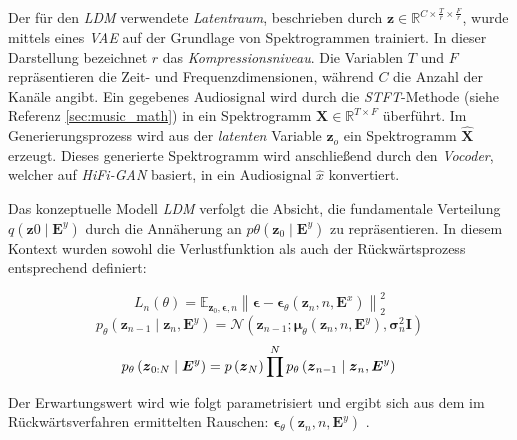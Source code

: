 \documentclass[
  a4paper,  %
  twoside,  %
  bibliography=totoc,
  headsepline,
  cleardoublepage=empty,
  parskip=half,
  draft=false
]{scrbook}
\begin{document}
Der für den \emph{LDM} verwendete \emph{Latentraum}, beschrieben durch $\boldsymbol{z} \in \mathbb{R}^{C \times \frac{T}{r} \times \frac{F}{r}}$, wurde mittels eines \emph{VAE} auf der Grundlage von Spektrogrammen trainiert. In dieser Darstellung bezeichnet $r$ das \emph{Kompressionsniveau}. Die Variablen $T$ und $F$ repräsentieren die Zeit- und Frequenzdimensionen, während $C$ die Anzahl der Kanäle angibt. Ein gegebenes Audiosignal wird durch die \emph{STFT}-Methode (siehe Referenz \ref{sec:music_math}) in ein Spektrogramm $\boldsymbol{X} \in \mathbb{R}^{T \times F}$ überführt. Im Generierungsprozess wird aus der \emph{latenten} Variable $\hat{\boldsymbol{z}}_o$ ein Spektrogramm $\hat{\boldsymbol{X}}$ erzeugt. Dieses generierte Spektrogramm wird anschließend durch den \emph{Vocoder}, welcher auf \emph{HiFi-GAN} \cite{kong_hifi-gan_2020} basiert, in ein Audiosignal $\hat{x}$ konvertiert. \cite{liu_audioldm_2023}

Das konzeptuelle Modell \emph{LDM} verfolgt die Absicht, die fundamentale Verteilung $q\left(\boldsymbol{z}0 \mid \boldsymbol{E}^y\right)$ durch die Annäherung an $p\theta\left(\boldsymbol{z}_0 \mid \boldsymbol{E}^y\right)$ zu repräsentieren. In diesem Kontext wurden sowohl die Verlustfunktion als auch der Rückwärtsprozess entsprechend definiert: \cite{liu_audioldm_2023}

\begin{equation}
    L_n(\theta)=\mathbb{E}_{\boldsymbol{z}_0, \boldsymbol{\epsilon}, n}\left\|\boldsymbol{\epsilon}-\boldsymbol{\epsilon}_\theta\left(\boldsymbol{z}_n, n, \boldsymbol{E}^x\right)\right\|_2^2
\end{equation}
\begin{equation}
    p_\theta\left(\boldsymbol{z}_{n-1} \mid \boldsymbol{z}_n, \boldsymbol{E}^y\right)=\mathcal{N}\left(\boldsymbol{z}_{n-1} ; \boldsymbol{\mu}_\theta\left(\boldsymbol{z}_n, n, \boldsymbol{E}^y\right), \boldsymbol{\sigma}_n^2 \boldsymbol{I}\right)
\end{equation}
\begin{equation}
    p_\theta\left(\boldsymbol{z}_{0: N} \mid \boldsymbol{E}^y\right)=p\left(\boldsymbol{z}_N\right) \prod^N p_\theta\left(\boldsymbol{z}_{n-1} \mid \boldsymbol{z}_n, \boldsymbol{E}^y\right) \\
\end{equation}

Der Erwartungswert wird wie folgt parametrisiert und ergibt sich aus dem im Rückwärtsverfahren ermittelten Rauschen: $\boldsymbol{\epsilon}_\theta\left(\boldsymbol{z}_n, n, \boldsymbol{E}^y\right)$ \cite{liu_audioldm_2023}.
\end{document}
